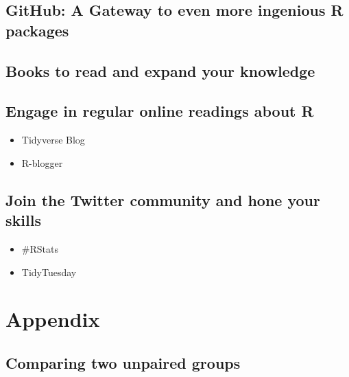 \documentclass[
]{book}
\providecommand{\tightlist}{%
  \setlength{\itemsep}{0pt}\setlength{\parskip}{0pt}}
\begin{document}
\hypertarget{next-steps-github}{%
\section{GitHub: A Gateway to even more ingenious R packages}\label{next-steps-github}}

\hypertarget{next-steps-books}{%
\section{Books to read and expand your knowledge}\label{next-steps-books}}

\hypertarget{next-steps-online-readings}{%
\section{Engage in regular online readings about R}\label{next-steps-online-readings}}

\begin{itemize}
\tightlist
\item
  Tidyverse Blog
\item
  R-blogger
\end{itemize}

\hypertarget{next-steps-twitter}{%
\section{Join the Twitter community and hone your skills}\label{next-steps-twitter}}

\begin{itemize}
\tightlist
\item
  \#RStats
\item
  TidyTuesday
\end{itemize}

\hypertarget{appendix}{%
\chapter*{Appendix}\label{appendix}}

\hypertarget{comparing-two-unpaired-groups}{%
\section{Comparing two unpaired groups}\label{comparing-two-unpaired-groups}}
\end{document}
